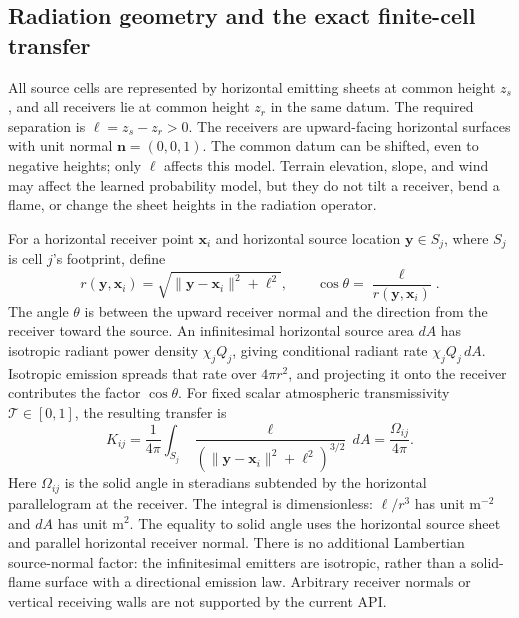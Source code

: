 \documentclass[11pt,a4paper]{article}
\begin{document}
\subsection{Radiation geometry and the exact finite-cell transfer}
\label{sec:heat-geometry}

All source cells are represented by horizontal emitting sheets at common
height $z_s$, and all receivers lie at common height $z_r$ in the same datum.
The required separation is $\ell=z_s-z_r>0$. The receivers are upward-facing
horizontal surfaces with unit normal $\mathbf n=(0,0,1)$. The common datum
can be shifted, even to negative heights; only $\ell$ affects this model.
Terrain elevation, slope, and wind may affect the learned probability model,
but they do not tilt a receiver, bend a flame, or change the sheet heights in
the radiation operator.

For a horizontal receiver point $\mathbf x_i$ and horizontal source location
$\mathbf y\in S_j$, where $S_j$ is cell $j$'s footprint, define
\begin{equation}
 r(\mathbf y,\mathbf x_i)=
    \sqrt{\|\mathbf y-\mathbf x_i\|^2+\ell^2},
 \qquad
 \cos\theta=\frac{\ell}{r(\mathbf y,\mathbf x_i)}.
\end{equation}
The angle $\theta$ is between the upward receiver normal and the direction
from the receiver toward the source. An infinitesimal horizontal source
area $dA$ has isotropic radiant power density $\chi_jQ_j$, giving conditional
radiant rate $\chi_jQ_j\,dA$. Isotropic emission spreads that rate over
$4\pi r^2$, and projecting it onto the receiver contributes the factor
$\cos\theta$. For fixed scalar atmospheric transmissivity
$\mathcal T\in[0,1]$, the resulting transfer is
\begin{equation}
 K_{ij}=\frac1{4\pi}\int_{S_j}
        \frac{\ell}{(\|\mathbf y-\mathbf x_i\|^2+\ell^2)^{3/2}}\,dA
       =\frac{\Omega_{ij}}{4\pi}.
 \label{eq:heat-transfer}
\end{equation}
Here $\Omega_{ij}$ is the solid angle in steradians subtended by the
horizontal parallelogram at the receiver. The integral is dimensionless:
$\ell/r^3$ has unit $\mathrm{m^{-2}}$ and $dA$ has unit $\mathrm{m^2}$.
The equality to solid angle uses the horizontal source sheet and parallel
horizontal receiver normal. There is no additional Lambertian source-normal
factor: the infinitesimal emitters are isotropic, rather than a solid-flame
surface with a directional emission law. Arbitrary receiver normals or
vertical receiving walls are not supported by the current API.\cite{heatrefs}
\end{document}

